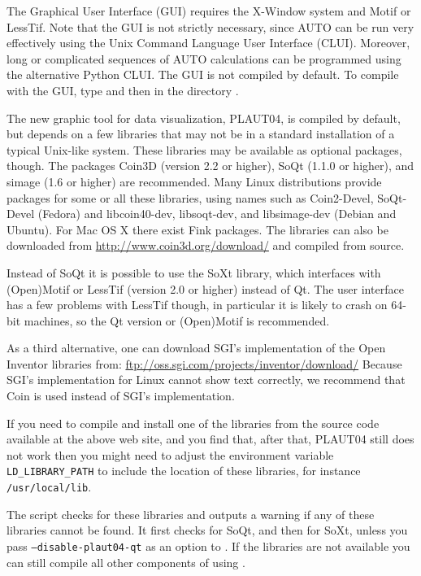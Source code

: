 \documentclass[12pt]{report}
\begin{document}
The Graphical User Interface (GUI) requires the {\cal X-Window} system
and {\cal Motif} or {\cal LessTif}.
Note that the GUI is not strictly necessary, since {\cal AUTO} can be
run very effectively using the Unix Command Language User Interface (CLUI).
Moreover, long or complicated sequences of {\cal AUTO} calculations can
be programmed using the alternative Python CLUI. 
The GUI is not compiled by default. To compile
\AUTO with the GUI, type 
and then  in the directory .

The new graphic tool for \AUTO data visualization, PLAUT04, is
compiled by default, but depends on a few libraries that may not be
in a standard installation of a typical Unix-like
system. These libraries may be available as optional packages,
though. The packages Coin3D (version 2.2 or higher), SoQt
(1.1.0 or higher), and simage (1.6 or higher) are recommended.
Many Linux distributions provide packages for some or all
these libraries, using names such as Coin2-Devel, SoQt-Devel (Fedora)
and libcoin40-dev, libsoqt-dev, and libsimage-dev (Debian and Ubuntu).
For Mac OS X there exist Fink packages.
The libraries can also be downloaded from
\url{http://www.coin3d.org/download/} and compiled from source.

Instead of SoQt it is possible to use the SoXt library, which
interfaces with (Open)Motif or LessTif (version 2.0 or higher)
instead of Qt. The user interface has a few problems with LessTif
though, in particular it is likely to crash on 64-bit machines, so the
Qt version or (Open)Motif is recommended.

As a third alternative, one can download SGI's implementation of the
Open Inventor libraries from:
\url{ftp://oss.sgi.com/projects/inventor/download/}
Because SGI's implementation for Linux cannot show text correctly, 
we recommend that Coin is used instead of SGI's implementation. 

If you need to compile and install one of the libraries
from the source code available at the above web site, and you
find that, after that, PLAUT04 still does not work then you might need to
adjust the environment variable {\tt LD\_LIBRARY\_PATH} to include
the location of these libraries, for instance {\tt /usr/local/lib}.

The  script checks
for these libraries and outputs a warning if any of these libraries
cannot be found. It first checks for SoQt, and then for SoXt, unless
you pass {\tt --disable-plaut04-qt} as an option to .
If the libraries are not available you can still compile
all other components of \AUTO using .
\end{document}
